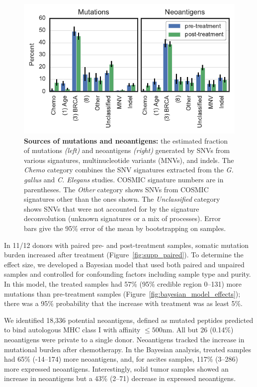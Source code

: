 \begin{figure}[htbp]
\centering
\includegraphics[scale=1.0]{figures/sources_of_mutations_and_neoantigens.pdf}
\caption{\textbf{Sources of mutations and neoantigens:} the estimated fraction of mutations \textit{(left)} and neoantigens \textit{(right)} generated by SNVs from various signatures, multinucleotide variants (MNVs), and indels. The \textit{Chemo} category combines the SNV signatures extracted from the \textit{G. gallus} and \textit{C. Elegans} studies. COSMIC signature numbers are in parentheses. The \textit{Other} category shows SNVs from COSMIC signatures other than the ones shown. The \textit{Unclassified} category shows SNVs that were not accounted for by the signature deconvolution (unknown signatures or a mix of processes). Error bars give the 95\% error of the mean by bootstrapping on samples.}
\label{fig:sources}
\end{figure}


In 11/12 donors with paired pre- and post-treatment samples, somatic mutation burden increased after treatment (Figure~\ref{fig:supp_paired}). To determine the effect size, we developed a Bayesian model that used both paired and unpaired samples and controlled for confounding factors including sample type and purity. In this model, the treated samples had 57\% (95\% credible region 0--131) more mutations than pre-treatment samples (Figure~\ref{fig:bayesian_model_effects}); there was a 95\% probability that the increase with treatment was as least 5\%.

We identified 18,336 potential neoantigens, defined as mutated peptides predicted to bind autologous MHC class I with affinity $\leq 500$nm. All but 26 (0.14\%) neoantigens were private to a single donor. Neoantigens tracked the increase in mutational burden after chemotherapy. In the Bayesian analysis, treated samples had 65\% (-14--174) more neoantigens, and, for ascites samples, 117\% (3--286) more expressed neoantigens. Interestingly, solid tumor samples showed an increase in neoantigens but a 43\% (2--71) decrease in expressed neoantigens.

